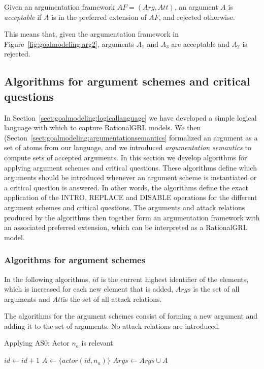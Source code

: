 \begin{definition} Given an argumentation framework $AF=(Arg,Att)$, an argument $A$ is \emph{acceptable} if $A$ is in the preferred extension of $AF$, and rejected otherwise. 
\end{definition}

This means that, given the argumentation framework in Figure~\ref{fig:goalmodeling:arg2}, arguments $A_1$ and $A_3$ are acceptable and $A_2$ is rejected.

\subsection{Algorithms for argument schemes and critical questions}
\label{sect:algorithms}

In Section~\ref{sect:goalmodeling:logicallanguage} we have developed a simple logical language with which to capture RationalGRL models. We then (Secton~\ref{sect:goalmodeling:argumentationsemantics} formalized an argument as a set of atoms from our language, and we introduced \emph{argumentation semantics} to compute sets of accepted arguments. In this section we develop algorithms for applying argument schemes and critical questions. These algorithms define which arguments should be introduced whenever an argument scheme is instantiated or a critical question is answered. In other words, the algorithms define the exact application of the \textsf{INTRO}, \textsf{REPLACE} and \textsf{DISABLE} operations for the different argument schemes and critical questions. The arguments and attack relations produced by the algorithms then together form an argumentation framework with an associated preferred extension, which can be interpreted as a RationalGRL model. 

\subsubsection*{Algorithms for argument schemes}

In the following algorithms, $id$ is the current highest identifier of the elements, which is increased for each new element that is added, $Args$ is the set of all arguments and $Att$is the set of all attack relations. 

The algorithms for the argument schemes consist of forming a new argument and adding it to the set of arguments. No attack relations are introduced.

\begin{algorithm}[h]
  \caption{Applying AS0: Actor $n_{a}$ is relevant}\label{alg:as0}
  \begin{algorithmic}[1]
    \State $id\gets id+1$\label{alg:as0:1}
    \State $A \gets \{actor(id, n_{a})\}$\label{alg:as0:2}
    \State $Args \gets Args \cup A$\label{alg:as0:3}
    \EndProcedure
  \end{algorithmic}
\end{algorithm}

